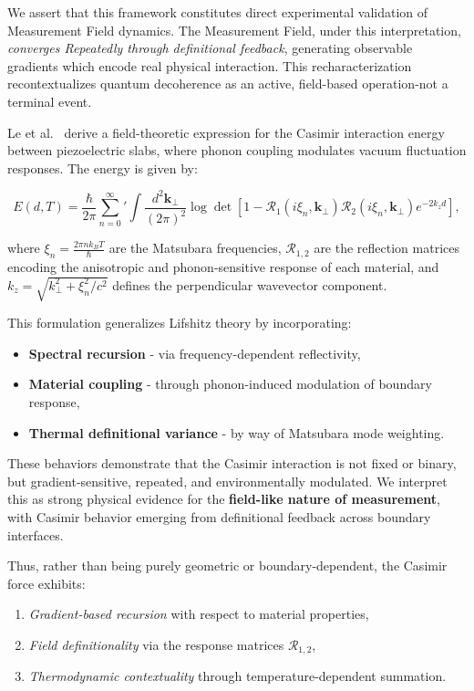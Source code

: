 We assert that this framework constitutes direct experimental validation of Measurement Field dynamics. The Measurement Field, under this interpretation, \textit{converges Repeatedly through definitional feedback}, generating observable gradients which encode real physical interaction. This recharacterization recontextualizes quantum decoherence as an active, field-based operation-not a terminal event.

Le et al.~\cite{le_phonon-assisted_2024} derive a field-theoretic expression for the Casimir interaction energy between piezoelectric slabs, where phonon coupling modulates vacuum fluctuation responses. The energy is given by:

\begin{equation}
E(d, T) = \frac{\hbar}{2\pi} \sum_{n=0}^\infty{}' \int \frac{d^2\mathbf{k}_\perp}{(2\pi)^2} \log\det\left[1 - \mathcal{R}_1(i\xi_n, \mathbf{k}_\perp)\mathcal{R}_2(i\xi_n, \mathbf{k}_\perp) e^{-2k_z d} \right],
\end{equation}

where \( \xi_n = \frac{2\pi n k_B T}{\hbar} \) are the Matsubara frequencies, \( \mathcal{R}_{1,2} \) are the reflection matrices encoding the anisotropic and phonon-sensitive response of each material, and \( k_z = \sqrt{k_\perp^2 + \xi_n^2/c^2} \) defines the perpendicular wavevector component.

This formulation generalizes Lifshitz theory by incorporating:
\begin{itemize}
    \item \textbf{Spectral recursion} - via frequency-dependent reflectivity,
    \item \textbf{Material coupling} - through phonon-induced modulation of boundary response,
    \item \textbf{Thermal definitional variance} - by way of Matsubara mode weighting.
\end{itemize}

These behaviors demonstrate that the Casimir interaction is not fixed or binary, but gradient-sensitive, repeated, and environmentally modulated. We interpret this as strong physical evidence for the \textbf{field-like nature of measurement}, with Casimir behavior emerging from definitional feedback across boundary interfaces.

Thus, rather than being purely geometric or boundary-dependent, the Casimir force exhibits:
\begin{enumerate}
    \item \textit{Gradient-based recursion} with respect to material properties,
    \item \textit{Field definitionality} via the response matrices \(\mathcal{R}_{1,2}\),
    \item \textit{Thermodynamic contextuality} through temperature-dependent summation.
\end{enumerate}

